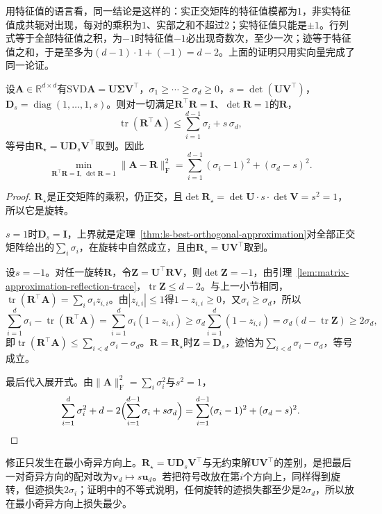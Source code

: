 用特征值的语言看，同一结论是这样的：实正交矩阵的特征值模都为$1$，非实特征值成共轭对出现，每对的乘积为$1$、实部之和不超过$2$；实特征值只能是$\pm1$。行列式等于全部特征值之积，为$-1$时特征值$-1$必出现奇数次，至少一次；迹等于特征值之和，于是至多为$(d-1)\cdot1+(-1)=d-2$。上面的证明只用实向量完成了同一论证。

\begin{theorem}[最佳旋转逼近]
\label{thm:matrix-approximation-best-rotation}
设$\bm A\in\mathbb R^{d\times d}$有SVD$\bm A=\bm U\bm\Sigma\bm V^\top$，$\sigma_1\geq\cdots\geq\sigma_d\geq0$，$s=\det(\bm U\bm V^\top)$，$\bm D_s=\operatorname{diag}(1,\ldots,1,s)$。则对一切满足$\bm R^\top\bm R=\bm I$、$\det\bm R=1$的$\bm R$，
\[
 \operatorname{tr}(\bm R^\top\bm A)\leq\sum_{i=1}^{d-1}\sigma_i+s\,\sigma_d ,
\]
等号由$\bm R_\star=\bm U\bm D_s\bm V^\top$取到。因此
\[
 \min_{\bm R^\top\bm R=\bm I,\ \det\bm R=1}\lVert\bm A-\bm R\rVert_{\mathrm F}^2
 =\sum_{i=1}^{d-1}(\sigma_i-1)^2+(\sigma_d-s)^2 .
\]
\end{theorem}
\begin{proof}
$\bm R_\star$是正交矩阵的乘积，仍正交，且$\det\bm R_\star=\det\bm U\cdot s\cdot\det\bm V=s^2=1$，所以它是旋转。

$s=1$时$\bm D_s=\bm I$，上界就是定理~\ref{thm:ls-best-orthogonal-approximation}对全部正交矩阵给出的$\sum_i\sigma_i$，在旋转中自然成立，且由$\bm R_\star=\bm U\bm V^\top$取到。

设$s=-1$。对任一旋转$\bm R$，令$\bm Z=\bm U^\top\bm R\bm V$，则$\det\bm Z=-1$，由引理~\ref{lem:matrix-approximation-reflection-trace}，$\operatorname{tr}\bm Z\leq d-2$。与上一小节相同，$\operatorname{tr}(\bm R^\top\bm A)=\sum_i\sigma_iz_{i,i}$。由$|z_{i,i}|\leq1$得$1-z_{i,i}\geq0$，又$\sigma_i\geq\sigma_d$，所以
\[
 \sum_{i=1}^d\sigma_i-\operatorname{tr}(\bm R^\top\bm A)
 =\sum_{i=1}^d\sigma_i(1-z_{i,i})
 \geq\sigma_d\sum_{i=1}^d(1-z_{i,i})
 =\sigma_d(d-\operatorname{tr}\bm Z)\geq2\sigma_d ,
\]
即$\operatorname{tr}(\bm R^\top\bm A)\leq\sum_{i<d}\sigma_i-\sigma_d$。$\bm R=\bm R_\star$时$\bm Z=\bm D_s$，迹恰为$\sum_{i<d}\sigma_i-\sigma_d$，等号成立。

最后代入展开式。由$\lVert\bm A\rVert_{\mathrm F}^2=\sum_i\sigma_i^2$与$s^2=1$，
\[
 \sum_{i=1}^d\sigma_i^2+d-2\Bigl(\sum_{i=1}^{d-1}\sigma_i+s\sigma_d\Bigr)
 =\sum_{i=1}^{d-1}(\sigma_i-1)^2+(\sigma_d-s)^2 .
\]
\end{proof}

修正只发生在最小奇异方向上。$\bm R_\star=\bm U\bm D_s\bm V^\top$与无约束解$\bm U\bm V^\top$的差别，是把最后一对奇异方向的配对改为$\bm v_d\mapsto s\bm u_d$。若把符号改放在第$i$个方向上，同样得到旋转，但迹损失$2\sigma_i$；证明中的不等式说明，任何旋转的迹损失都至少是$2\sigma_d$，所以放在最小奇异方向上损失最少。

